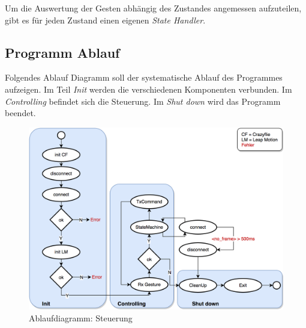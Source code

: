 Um die Auswertung der Gesten abhängig des Zustandes angemessen aufzuteilen, gibt es für jeden Zustand einen eigenen \textit{State Handler}.

\newpage
\subsection{Programm Ablauf}
Folgendes Ablauf Diagramm soll der systematische Ablauf des Programmes aufzeigen.
Im Teil \textit{Init} werden die verschiedenen Komponenten verbunden.
Im \textit{Controlling} befindet sich die Steuerung.
Im \textit{Shut down} wird das Programm beendet.

\vspace{7mm}
\begin{figure}[H]
	\centering
	\includegraphics[width=1.0\textwidth]{figures/poc/flowchart_controll.png}
	\caption{Ablaufdiagramm: Steuerung}
\end{figure}


\newpage
